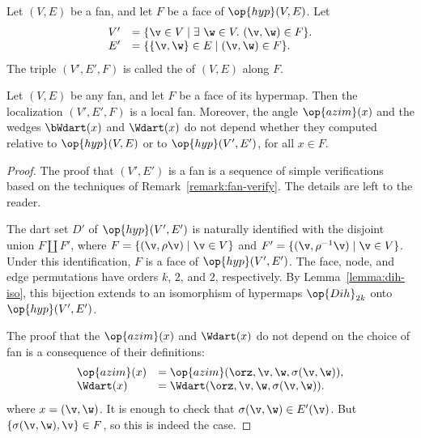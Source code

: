 \begin{definition}[localization]
 Let $(V,E)$ be a fan, and let $F$ be
a face of $\op{hyp}(V,E)$.  Let
\begin{displaymath}
\begin{array}{rll}
V' &= \{\v\in V \mid \exists~\w\in V.~(\v,\w)\in F\}.\\
E' &= \{\{\v,\w\} \in E\mid (\v,\w)\in F\}.
\end{array}
\end{displaymath}
The triple $(V',E',F)$ is called the  of $(V,E)$ along $F$.
\end{definition}
%


\begin{lemma}[localization]
\label{lemma:localization}
Let $(V,E)$ be any fan, and let $F$ be a face of its hypermap.  Then
the localization $(V',E',F)$ is a local fan.  Moreover, the angle
$\op{azim}(x)$ and the wedges $\bWdart(x)$ and $\Wdart(x)$ do not depend
whether they computed relative to $\op{hyp}(V,E)$ or to
$\op{hyp}(V',E')$, for all $x\in F$.
\end{lemma}



\begin{proof}
The proof that $(V',E')$ is a fan is a sequence of simple
verifications based on the techniques of
Remark~\ref{remark:fan-verify}.  The details are left to the reader.

The dart set $D'$ of $\op{hyp}(V',E')$ is naturally identified with
the disjoint union $F\coprod F'$, where $F = \{(\v,\rho\v) \mid \v\in
V\}$ and $F'=\{(\v,\rho^{-1}\v) \mid \v\in V\}$.  Under this
identification, $F$ is a face of $\op{hyp}(V',E')$.  The face, node,
and edge permutations have orders $k$, $2$, and $2$, respectively.  By
Lemma~\ref{lemma:dih-iso}, this bijection extends to an isomorphism of
hypermaps $\op{Dih}_{2k}$ onto $\op{hyp}(V',E')$.

The proof that the $\op{azim}(x)$ and $\Wdart(x)$ do not depend on the
choice of fan is a consequence of their definitions:
\begin{displaymath}
\begin{array}{lll}
\op{azim}(x) &= \op{azim}(\orz,\v,\w,\sigma(\v,\w)),\\
\Wdart(x) &= \Wdart(\orz,\v,\w,\sigma(\v,\w)).\\
\end{array}
\end{displaymath}
where $x = (\v,\w)$.  It is enough to check that $\sigma(\v,\w)\in
E'(\v)$.  But $\{\sigma(\v,\w),\v\}\in F$, so this is indeed the case.
\end{proof}



